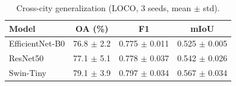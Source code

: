 \begin{table}[h]
\centering
\caption{Cross-city generalization (LOCO, 3 seeds, mean $\pm$ std).}
\label{tab:loco}
\begin{tabular}{lccc}
\toprule
Model & OA (\%) & F1 & mIoU \\
\midrule
EfficientNet-B0 & 76.8 $\pm$ 2.2 & 0.775 $\pm$ 0.011 & 0.525 $\pm$ 0.005 \\
ResNet50 & 77.1 $\pm$ 5.1 & 0.778 $\pm$ 0.037 & 0.542 $\pm$ 0.026 \\
Swin-Tiny & 79.1 $\pm$ 3.9 & 0.797 $\pm$ 0.034 & 0.567 $\pm$ 0.034 \\
\bottomrule
\end{tabular}
\end{table}